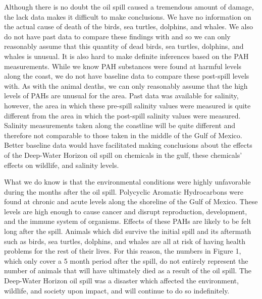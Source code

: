 \documentclass[authoryear,12pt]{elsarticle}
\begin{document}
Although there is no doubt the oil spill caused a tremendous amount of damage, the lack data makes it difficult to make conclusions. We have no information on the actual cause of death of the birds, sea turtles, dolphins, and whales.  We also do not have past data to compare these findings with and so we can only reasonably assume that this quantity of dead birds, sea turtles, dolphins, and whales is unusual. It is also hard to make definite inferences based on the PAH measurements.  While we know PAH substances were found at harmful levels along the coast, we do not have baseline data to compare these post-spill levels with. As with the animal deaths, we can only reasonably assume that the high levels of PAHs are unusual for the area. Past data was available for salinity, however, the area in which these pre-spill salinity values were measured is quite different from the area in which the post-spill salinity values were measured.  Salinity measurements taken along the coastline will be quite different and therefore not comparable to those taken in the middle of the Gulf of Mexico. Better baseline data would have facilitated making conclusions about the effects of the Deep-Water Horizon oil spill on chemicals in the gulf, these chemicals' effects on wildlife, and salinity levels.

 What we do know is that the environmental conditions were highly unfavorable during the months after the oil spill. Polycyclic Aromatic Hydrocarbons were found at chronic and acute levels along the shoreline of the Gulf of Mexico. These levels are high enough to cause cancer and disrupt reproduction, development, and the immune system of organisms. Effects of these PAHs are likely to be felt long after the spill. Animals which did survive the initial spill and its aftermath such as birds, sea turtles, dolphins, and whales are all at risk of having health problems for the rest of their lives. For this reason, the numbers in Figure 1, which only cover a 5 month period after the spill, do not entirely represent the number of animals that will have ultimately died as a result of the oil spill. The Deep-Water Horizon oil spill was a disaster which affected the environment, wildlife, and society upon impact, and will continue to do so indefinitely.



\end{document}
